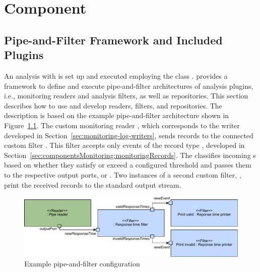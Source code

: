 % 

\chapter{\KiekerAnalysisPart{} Component}\label{chap:componentsAnalysis}


\section{Pipe-and-Filter Framework and Included Plugins}\label{sec:analysis:controller}

An analysis with \KiekerAnalysisPart{} is set up and executed employing %
the class . %
\KiekerAnalysisPart{} provides a framework to define and execute pipe-and-filter %
architectures of analysis plugins, i.e., monitoring readers and analysis filters, %
as well as repositories. %
This section describes how to use and develop readers, filters, and %
repositories. The description is based on the example %
pipe-and-filter architecture shown in Figure~\ref{fig:example:pipe-and-filter}. The custom monitoring reader %
, which corresponds to the writer developed in Section~\ref{sec:monitoring-log-writers}, %
sends records to the connected custom filter . %
This filter accepts only events of the record type , 
developed in Section~\ref{sec:componentsMonitoring:monitoringRecords}. %
The  classifies incoming s %
based on whether they satisfy or exceed a configured threshold and passes them %
to the respective output ports,  or . %
Two instances of a second custom filter, , %
print the received records to the standard output stream.

\begin{figure}
\includegraphics[width=\textwidth]{images/example-pipe-and-filter}
\caption{Example pipe-and-filter configuration}
\label{fig:example:pipe-and-filter}
\end{figure}

